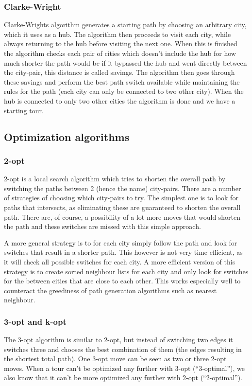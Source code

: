 \documentclass[article,11pt]{article}
\begin{document}
\subsubsection{Clarke-Wright}
Clarke-Wrights algorithm generates a starting path by choosing an
arbitrary city, which it uses as a hub. The algorithm then proceeds to
visit each city, while always returning to the hub before  visiting
the next one. When this is finished the algorithm checks each pair of
cities which doesn’t include the hub for how much shorter the path
would be if it bypassed the hub and went directly between the
city-pair, this distance is called savings. The algorithm then goes
through these savings and perform the best path switch available while
maintaining the rules for the path (each city can only be connected to
two other city). When the hub is connected to only two other cities
the algorithm is done and we have a starting tour.
\subsection{Optimization algorithms}
\subsubsection{2-opt}
2-opt is a local search algorithm which tries to shorten the overall
path by switching the paths between 2 (hence the name)
city-pairs. There are a number of strategies of choosing which
city-pairs to try. The simplest one is to look for paths that
intersects, as eliminating these are guaranteed to shorten the overall
path. There are, of course, a possibility of a lot more moves that
would shorten the path and these switches are missed with this simple
approach.

A more general strategy is to for each city simply follow the path and
look for switches that result in a shorter path. This however is not
very time efficient, as it will check all possible switches for each
city. A more efficient version of this strategy is to create sorted
neighbour lists for each city and only look for switches for the
between cities that are close to each other. This works especially
well to counteract the greediness of path generation algorithms such
as nearest neighbour.
\subsubsection{3-opt and k-opt}
The 3-opt algorithm is similar to 2-opt, but instead of switching two
edges it switches three and chooses the best combination of them (the
edges resulting in the shortest total path). One 3-opt move can be
seen as two or three 2-opt moves. When a tour can’t be optimized any
further with 3-opt (“3-optimal”), we also know that it can’t be more
optimized any further with 2-opt (“2-optimal”).
\end{document}
